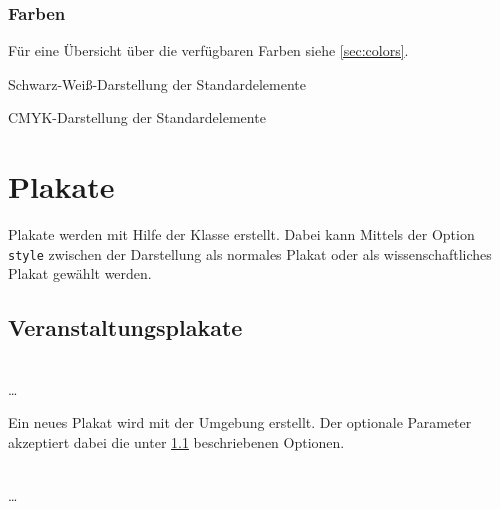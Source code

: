 \documentclass[a4paper,11pt]{tubsreprt}
\begin{document}
\subsection{Farben}

Für eine Übersicht über die verfügbaren Farben siehe \ref{sec:colors}.%

\begin{Declaration}
\end{Declaration}

Schwarz-Weiß-Darstellung der Standardelemente

\begin{Declaration}
\end{Declaration}

CMYK-Darstellung der Standardelemente


\chapter{Plakate}

Plakate werden mit Hilfe der Klasse  erstellt.
Dabei kann Mittels der Option \texttt{style} zwischen der Darstellung als
normales Plakat oder als wissenschaftliches Plakat gewählt werden.

\section{Veranstaltungsplakate}

\begin{Declaration}
    \\
  \quad\dots\\
\end{Declaration}

Ein neues Plakat wird mit der Umgebung  erstellt.
Der optionale Parameter  akzeptiert dabei die
unter \ref{} beschriebenen Optionen.

\begin{Declaration}
    \\%
  \quad\dots\\
\end{Declaration}
\end{document}
